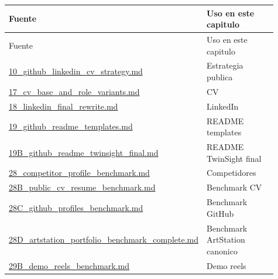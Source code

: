\begin{center}
\scriptsize
\begin{longtable}{>{\raggedright\arraybackslash}p{0.455\linewidth} >{\raggedright\arraybackslash}p{0.455\linewidth}}
\toprule
Fuente & Uso en este capitulo \\
\midrule
\endfirsthead
\toprule
Fuente & Uso en este capitulo \\
\midrule
\endhead
\href{file:///E:/Laboral/10_github_linkedin_cv_strategy.md}{10\_github\_linkedin\_cv\_strategy.md} & Estrategia publica \\
\href{file:///E:/Laboral/17_cv_base_and_role_variants.md}{17\_cv\_base\_and\_role\_variants.md} & CV \\
\href{file:///E:/Laboral/18_linkedin_final_rewrite.md}{18\_linkedin\_final\_rewrite.md} & LinkedIn \\
\href{file:///E:/Laboral/19_github_readme_templates.md}{19\_github\_readme\_templates.md} & README templates \\
\href{file:///E:/Laboral/19B_github_readme_twinsight_final.md}{19B\_github\_readme\_twinsight\_final.md} & README TwinSight final \\
\href{file:///E:/Laboral/28_competitor_profile_benchmark.md}{28\_competitor\_profile\_benchmark.md} & Competidores \\
\href{file:///E:/Laboral/28B_public_cv_resume_benchmark.md}{28B\_public\_cv\_resume\_benchmark.md} & Benchmark CV \\
\href{file:///E:/Laboral/28C_github_profiles_benchmark.md}{28C\_github\_profiles\_benchmark.md} & Benchmark GitHub \\
\href{file:///E:/Laboral/28D_artstation_portfolio_benchmark_complete.md}{28D\_artstation\_portfolio\_benchmark\_complete.md} & Benchmark ArtStation canonico \\
\href{file:///E:/Laboral/29B_demo_reels_benchmark.md}{29B\_demo\_reels\_benchmark.md} & Demo reels \\
\bottomrule
\end{longtable}
\end{center}


